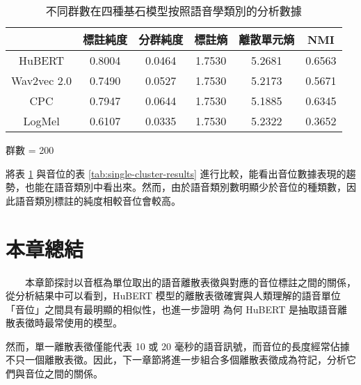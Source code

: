 \begin{table}[!htbp]
            \vspace{0.2cm}        

            \begin{subtable}[t]{\textwidth}
                \centering
                \begin{tabular}{|c|c|c|c|c|c|} \hline 
                                & 標註純度 & 分群純度 & 標註熵 & 離散單元熵 &     NMI \\ \hline 
                    HuBERT      &           0.8004 &   0.0464 &         1.7530 &     5.2681 &  0.6563 \\ \hline    %
                    Wav2vec 2.0 &           0.7490 &   0.0527 &         1.7530 &     5.2173 &  0.5671 \\ \hline    %
                    CPC         &           0.7947 &   0.0644 &         1.7530 &     5.1885 &  0.6345 \\ \hline    %
                    LogMel      &           0.6107 &   0.0335 &         1.7530 &     5.2322 &  0.3652 \\ \hline    %
                \end{tabular}
                \caption{群數 = 200}
                \label{tab:ch3-clu200}
            \end{subtable}        

            \caption{不同群數在四種基石模型按照語音學類別的分析數據}
            \label{tab:single-cluster-phonetype-results}
        \end{table}
        將表 \ref{tab:single-cluster-phonetype-results} 與音位的表 \ref{tab:single-cluster-results} 進行比較，能看出音位數據表現的趨勢，也能在語音類別中看出來。然而，由於語音類別數明顯少於音位的種類數，因此語音類別標註的純度相較音位會較高。


\section{本章總結}

　　本章節探討以音框為單位取出的語音離散表徵與對應的音位標註之間的關係，從分析結果中可以看到，HuBERT 模型的離散表徵確實與人類理解的語音單位「音位」之間具有最明顯的相似性，也進一步證明
為何 HuBERT 是抽取語音離散表徵時最常使用的模型。


然而，單一離散表徵僅能代表 10 或 20 毫秒的語音訊號，而音位的長度經常佔據不只一個離散表徵。因此，下一章節將進一步組合多個離散表徵成為符記，分析它們與音位之間的關係。
